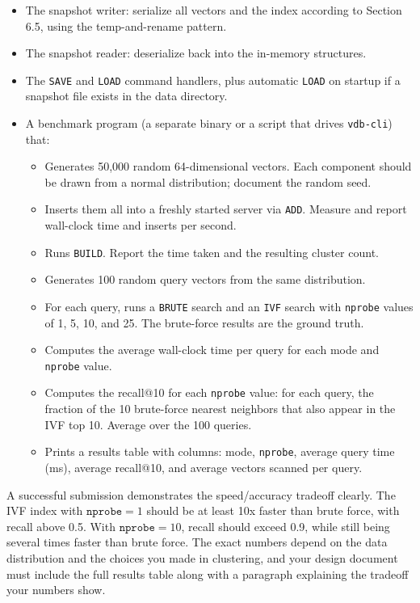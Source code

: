 \documentclass[11pt,a4paper]{article}
\begin{document}
\begin{itemize}
\item The snapshot writer: serialize all vectors and the index according to Section 6.5, using the temp-and-rename pattern.
\item The snapshot reader: deserialize back into the in-memory structures.
\item The \texttt{SAVE} and \texttt{LOAD} command handlers, plus automatic \texttt{LOAD} on startup if a snapshot file exists in the data directory.
\item A benchmark program (a separate binary or a script that drives \texttt{vdb-cli}) that:
  \begin{itemize}
  \item Generates 50{,}000 random 64-dimensional vectors. Each component should be drawn from a normal distribution; document the random seed.
  \item Inserts them all into a freshly started server via \texttt{ADD}. Measure and report wall-clock time and inserts per second.
  \item Runs \texttt{BUILD}. Report the time taken and the resulting cluster count.
  \item Generates 100 random query vectors from the same distribution.
  \item For each query, runs a \texttt{BRUTE} search and an \texttt{IVF} search with \texttt{nprobe} values of 1, 5, 10, and 25. The brute-force results are the ground truth.
  \item Computes the average wall-clock time per query for each mode and \texttt{nprobe} value.
  \item Computes the recall@10 for each \texttt{nprobe} value: for each query, the fraction of the 10 brute-force nearest neighbors that also appear in the IVF top 10. Average over the 100 queries.
  \item Prints a results table with columns: mode, \texttt{nprobe}, average query time (ms), average recall@10, and average vectors scanned per query.
  \end{itemize}
\end{itemize}

A successful submission demonstrates the speed/accuracy tradeoff clearly. The IVF index with $\texttt{nprobe} = 1$ should be at least 10x faster than brute force, with recall above 0.5. With $\texttt{nprobe} = 10$, recall should exceed 0.9, while still being several times faster than brute force. The exact numbers depend on the data distribution and the choices you made in clustering, and your design document must include the full results table along with a paragraph explaining the tradeoff your numbers show.
\end{document}
